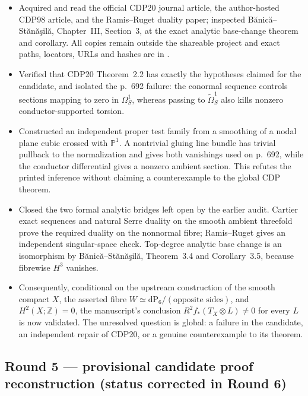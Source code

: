 \begin{itemize}[leftmargin=1.8em]
\item Acquired and read the official CDP20 journal article, the
author-hosted CDP98 article, and the Ramis--Ruget duality paper; inspected
B\u{a}nic\u{a}--St\u{a}n\u{a}\c{s}il\u{a}, Chapter~III, Section~3, at the
exact analytic base-change theorem and corollary.  All copies remain outside
the shareable project and exact paths, locators, URLs and hashes are in
.
\item Verified that CDP20 Theorem~2.2 has exactly the hypotheses claimed for
the candidate, and isolated the p.~692 failure: the conormal sequence controls
sections mapping to zero in $\Omega^1_S$, whereas passing to
$\widetilde\Omega^1_S$ also kills nonzero conductor-supported torsion.
\item Constructed an independent proper test family from a smoothing of a
nodal plane cubic crossed with $\mathbb P^1$.  A nontrivial gluing line bundle
has trivial pullback to the normalization and gives both vanishings used on
p.~692, while the conductor differential gives a nonzero ambient section.
This refutes the printed inference without claiming a counterexample to the
global CDP theorem.
\item Closed the two formal analytic bridges left open by the earlier audit.
Cartier exact sequences and natural Serre duality on the smooth ambient
threefold prove the required duality on the nonnormal fibre; Ramis--Ruget
gives an independent singular-space check.  Top-degree analytic base change
is an isomorphism by B\u{a}nic\u{a}--St\u{a}n\u{a}\c{s}il\u{a}, Theorem~3.4
and Corollary~3.5, because fibrewise $H^3$ vanishes.
\item Consequently, conditional on the upstream construction of the smooth
compact $X$, the asserted fibre $W\simeq\mathrm{dP}_6/(\text{opposite
sides})$, and $H^2(X;\mathbb Z)=0$, the manuscript's conclusion
$R^2f_*(T_X\otimes L)\ne0$ for every $L$ is now validated.  The unresolved
question is global: a failure in the candidate, an independent repair of
CDP20, or a genuine counterexample to its theorem.
\end{itemize}

\subsection*{Round 5 --- provisional candidate proof reconstruction
(status corrected in Round 6)}


